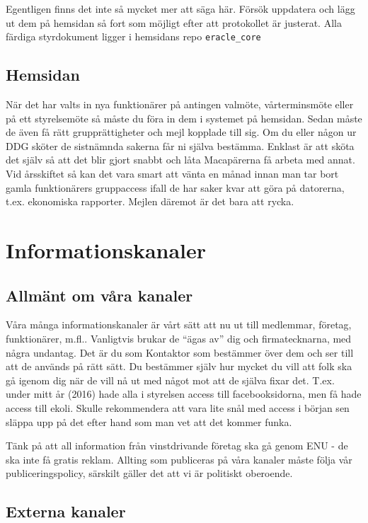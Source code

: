 \documentclass[10pt]{article}
\begin{document}
Egentligen finns det inte så mycket mer att säga här. Försök uppdatera och lägg ut dem på hemsidan så fort som möjligt efter att protokollet är justerat. Alla färdiga styrdokument ligger i hemsidans repo \texttt{eracle\_core}

\subsection{Hemsidan}
När det har valts in nya funktionärer på antingen valmöte, vårterminsmöte eller på ett styrelsemöte så måste du föra in dem i systemet på hemsidan. Sedan måste de även få rätt grupprättigheter och mejl kopplade till sig. Om du eller någon ur DDG sköter de sistnämnda sakerna får ni själva bestämma. Enklast är att sköta det själv så att det blir gjort snabbt och låta Macapärerna få arbeta med annat. Vid årsskiftet så kan det vara smart att vänta en månad innan man tar bort gamla funktionärers gruppaccess ifall de har saker kvar att göra på datorerna, t.ex. ekonomiska rapporter. Mejlen däremot är det bara att rycka.

\section{Informationskanaler}
\subsection{Allmänt om våra kanaler}
Våra många informationskanaler är vårt sätt att nu ut till medlemmar, företag, funktionärer, m.fl.. Vanligtvis brukar de ``ägas av'' dig och firmatecknarna, med några undantag. Det är du som Kontaktor som bestämmer över dem och ser till att de används på rätt sätt. Du bestämmer själv hur mycket du vill att folk ska gå igenom dig när de vill nå ut med något mot att de själva fixar det. T.ex. under mitt år (2016) hade alla i styrelsen access till facebooksidorna, men få hade access till ekoli. Skulle rekommendera att vara lite snål med access i början sen släppa upp på det efter hand som man vet att det kommer funka.

Tänk på att all information från vinstdrivande företag ska gå genom ENU - de ska inte få gratis reklam. Allting som publiceras på våra kanaler måste följa vår publiceringspolicy, särskilt gäller det att vi är politiskt oberoende.

\subsection{Externa kanaler}
\end{document}
